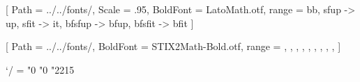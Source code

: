 [
    Path            = ../../fonts/,
    Scale           = .95,
    BoldFont        = LatoMath.otf,
    range           = {bb, sfup -> up, sfit -> it, bfsfup -> bfup, bfsfit -> bfit}
]

[
    Path            = ../../fonts/,
    BoldFont        = STIX2Math-Bold.otf,
    range           = {\int, \sum, \prod, \coprod, \bigoplus, \bigotimes, \bigcup, \bigcap, \bigvee, \bigwedge}
]

\Umathcode`/  =  "0 "0 "2215    %

\AtBeginDocument{
    \hfuzz=2pt
    \emergencystretch 2em
    \setlength{\belowdisplayshortskip}{\belowdisplayskip}
}

\usepackage{tikz}

\renewcommand{\titlepage}[2]{%
    \clearpage%
    \thispagestyle{empty}%
    \vspace*{20mm}%
    \centerline{\begin{tikzpicture}
        \node [scale = 3] at (0, 0) {\sffamily 荷\hspace{.5em}思};
        \node [scale = 1.8] at (0, -94.5mm) {\sffamily #1};
        \node [scale = 1.2] at (0, -105mm) {\sffamily #2};
        \draw (-16mm, -8mm) -- (16mm, -8mm);
        \draw (-14mm, -100mm) -- (14mm, -100mm);
        \draw (-13mm, -110mm) -- (13mm, -110mm);
    \end{tikzpicture}}%
    \clearpage%
}

\newcommand{\committee}{%
    \clearpage%
    \thispagestyle{empty}%
    \vspace*{120mm}%
}

\newcommand{\committeeitem}[2]{%
    \par%
    {%
        \leftskip=3em%
        \rightskip=8em%
        \parindent=-3em%
        {\bfseries\sffamily#1}\quad%
        {\sffamily#2}%
        \par\vspace{6pt}%
    }%
}

\newcommand{\toctitle}{%
    \clearpage%
    \thispagestyle{empty}%
    \vspace*{15mm}%
    \noindent{\huge\sffamily 目录}%
    \par\vspace{10mm}%
}

\newcommand{\tocsection}[1]{%
    \par\vspace{6mm}%
    \noindent{\large\sffamily #1}%
    \par\vspace{4mm}%
}

\newcommand{\tocitem}[3]{%
    \par%
    {%
        \leftskip=3em%
        \parindent=-3em%
        \makebox[2em][r]{\textbf{\textsf{#3}}}%
        \quad#1%
        \hfill\mbox{}\hfill\phantom{#2}\hfill\makebox[0em][r]{#2}%
        \par\vspace{8pt}%
    }%
}

\usepackage[strict]{changepage}

\AtEndDocument{%
  \checkoddpage\ifoddpage\newpage\thispagestyle{empty}\mbox{}\fi
}
